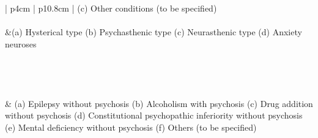\begin{longtable}[!t]{ | p{4cm} | p{10.8cm} | }
(c) Other conditions (to be specified) \\
 \\ \hline
 &(a) Hysterical type \newline
(b) Psychasthenic type \newline
(c) Neurasthenic type \newline
(d) Anxiety neuroses \\
  \\ \hline
{} \\ \hline
{} \\ \hline
{} \\ \hline
 & (a) Epilepsy without psychosis \newline
(b) Alcoholism with psychosis \newline
(c) Drug addition without psychosis \newline
(d) Constitutional psychopathic inferiority without psychosis \newline
(e) Mental deficiency without psychosis \newline
(f) Others (to be specified)\\ \hline
\caption{Statistical Manual for the Use of Institutions for the Insane classification of insanity, 1918}
\label{table: 1918Classification}
\end{longtable}


